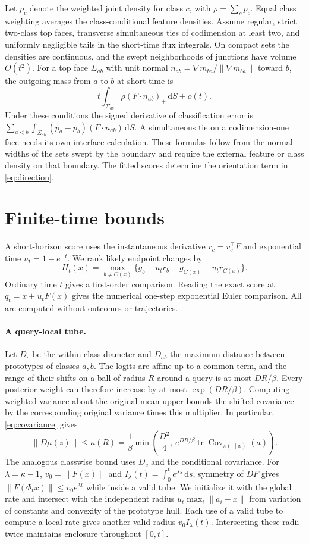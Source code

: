 \documentclass[10pt]{article}
\newcommand{\Cov}{\operatorname{Cov}}
\newcommand{\tr}{\operatorname{tr}}
\newcommand{\dd}{\mathrm{d}}
\newcommand{\norm}[1]{\lVert #1\rVert}
\begin{document}
Let $p_c$ denote the weighted joint density for class $c$, with $\rho=\sum_c p_c$. Equal class weighting averages the class-conditional feature densities. Assume regular, strict two-class top faces, transverse simultaneous ties of codimension at least two, and uniformly negligible tails in the short-time flux integrals. On compact sets the densities are continuous, and the swept neighborhoods of junctions have volume $O(t^2)$. For a top face $\Sigma_{ab}$ with unit normal $n_{ab}=\nabla m_{ba}/\norm{\nabla m_{ba}}$ toward $b$, the outgoing mass from $a$ to $b$ at short time is
\[
 t\int_{\Sigma_{ab}}\rho(F\cdot n_{ab})_+\,\dd S+o(t).
\]
Under these conditions the signed derivative of classification error is $\sum_{a<b}\int_{\Sigma_{ab}}(p_a-p_b)(F\cdot n_{ab})\,\dd S$. A simultaneous tie on a codimension-one face needs its own interface calculation. These formulas follow from the normal widths of the sets swept by the boundary and require the external feature or class density on that boundary. The fitted scores determine the orientation term in \eqref{eq:direction}.



\section{Finite-time bounds}
\label{sec:bounds}
A short-horizon score uses the instantaneous derivative $r_c=v_c^\top F$ and exponential time $u_t=1-e^{-t}$. We rank likely endpoint changes by
\[
 H_t(x)=\max_{b\ne C(x)}\{g_b+u_t r_b-g_{C(x)}-u_t r_{C(x)}\}.
\]
Ordinary time $t$ gives a first-order comparison. Reading the exact score at $q_t=x+u_t F(x)$ gives the numerical one-step exponential Euler comparison. All are computed without outcomes or trajectories.

\paragraph{A query-local tube.}
Let $D_c$ be the within-class diameter and $D_{ab}$ the maximum distance between prototypes of classes $a,b$. The logits are affine up to a common term, and the range of their shifts on a ball of radius $R$ around a query is at most $DR/\beta$. Every posterior weight can therefore increase by at most $\exp(DR/\beta)$. Computing weighted variance about the original mean upper-bounds the shifted covariance by the corresponding original variance times this multiplier. In particular, \eqref{eq:covariance} gives
\[
 \norm{D\mu(z)}\le \kappa(R)=\frac1\beta\min\!\left(
 \frac{D^2}{4},\, e^{DR/\beta}\tr\Cov_{\pi(\cdot\mid x)}(a)\right).
\]
The analogous classwise bound uses $D_c$ and the conditional covariance. For $\lambda=\kappa-1$, $v_0=\norm{F(x)}$ and $I_\lambda(t)=\int_0^t e^{\lambda s}\,\dd s$, symmetry of $DF$ gives $\norm{F(\Phi_t x)}\le v_0e^{\lambda t}$ while inside a valid tube. We initialize it with the global rate and intersect with the independent radius $u_t\max_i\norm{a_i-x}$ from variation of constants and convexity of the prototype hull. Each use of a valid tube to compute a local rate gives another valid radius $v_0 I_\lambda(t)$. Intersecting these radii twice maintains enclosure throughout $[0,t]$.
\end{document}

